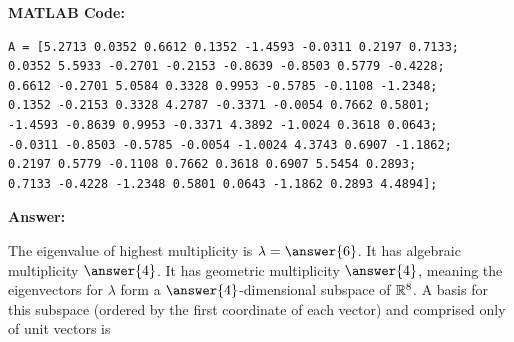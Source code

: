 \documentclass{ximera}
\begin{document}
\begin{example}
\begin{enumerate}
\textbf{MATLAB Code:}
\begin{verbatim}
A = [5.2713 0.0352 0.6612 0.1352 -1.4593 -0.0311 0.2197 0.7133;
0.0352 5.5933 -0.2701 -0.2153 -0.8639 -0.8503 0.5779 -0.4228;
0.6612 -0.2701 5.0584 0.3328 0.9953 -0.5785 -0.1108 -1.2348;
0.1352 -0.2153 0.3328 4.2787 -0.3371 -0.0054 0.7662 0.5801;
-1.4593 -0.8639 0.9953 -0.3371 4.3892 -1.0024 0.3618 0.0643;
-0.0311 -0.8503 -0.5785 -0.0054 -1.0024 4.3743 0.6907 -1.1862;
0.2197 0.5779 -0.1108 0.7662 0.3618 0.6907 5.5454 0.2893;
0.7133 -0.4228 -1.2348 0.5801 0.0643 -1.1862 0.2893 4.4894];
\end{verbatim}


\textbf{Answer:}

The eigenvalue of highest multiplicity is $\lambda=\answer{6}$. It has algebraic multiplicity $\answer{4}$. It has geometric multiplicity $\answer{4}$, meaning the eigenvectors for $\lambda$ form a $\answer{4}$-dimensional subspace of $\mathbb{R}^8$. A basis for this subspace (ordered by the first coordinate of each vector) and comprised only of unit vectors is


\end{enumerate}
\end{example}
\end{document}
